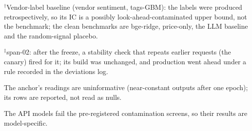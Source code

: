 \begin{table}[htbp]
\begin{threeparttable}
\begin{tablenotes}[flushleft]
\item $^{\dagger}$Vendor-label baseline (vendor sentiment, tags-GBM): the labels were produced retrospectively, so its IC is a possibly look-ahead-contaminated upper bound, not the benchmark; the clean benchmarks are bge-ridge, price-only, the LLM baseline and the random-signal placebo.
\item $^{\ddagger}$span-02: after the freeze, a stability check that repeats earlier requests (the canary) fired for it; its build was unchanged, and production went ahead under a rule recorded in the deviations log.
\item The anchor's readings are uninformative (near-constant outputs after one epoch); its rows are reported, not read as nulls.
\item The API models fail the pre-registered contamination screens, so their results are model-specific.
\end{tablenotes}
\end{threeparttable}
\end{table}
